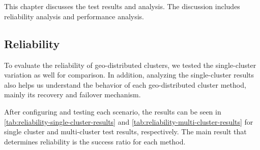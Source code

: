 \chapter{\babLima}
\label{bab:5}
This chapter discusses the test results and analysis. The discussion includes reliability analysis and performance analysis.



\section{Reliability}
\label{sec:analisis}
To evaluate the reliability of geo-distributed clusters, we tested the single-cluster variation as well for comparison. In addition, analyzing the single-cluster results also helps us understand the behavior of each geo-distributed cluster method, mainly its recovery and failover mechanism.

After configuring and testing each scenario, the results can be seen in \autoref{tab:reliability-single-cluster-results} and \autoref{tab:reliability-multi-cluster-results} for single cluster and multi-cluster test results, respectively. The main result that determines reliability is the success ratio for each method.

